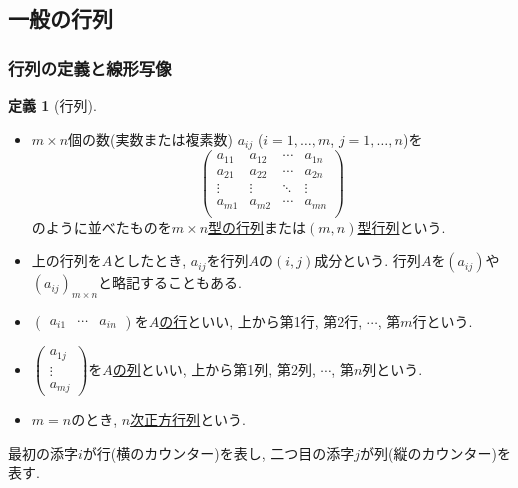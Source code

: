 \documentclass[dvipdfmx,a4paper,11pt]{article}
\theoremstyle{definition}
\newtheorem{dfn}[thm]{定義}
\begin{document}
\subsection{一般の行列 \cite[2.2節]{M}}
\label{subsec-2.2}
\subsubsection{行列の定義と線形写像}
\begin{tcolorbox}[
    colback = white,
    colframe = green!35!black,
    fonttitle = \bfseries,
    breakable = true]
    \begin{dfn}[行列]
    
\begin{itemize}
	\setlength{\parskip}{0cm}
  	\setlength{\itemsep}{0pt} 
\item $m \times n$個の数(実数または複素数) $a_{ij}$ ($i = 1, \ldots, m$, $j = 1, \ldots, n$)を
$$
\begin{pmatrix}
a_{11}& a_{12} & \cdots &a_{1n} \\
a_{21}& a_{22} & \cdots &a_{2n} \\
\vdots& \vdots	&	\ddots   &	\vdots \\
a_{m1}& a_{m2} & \cdots &a_{mn} \\
\end{pmatrix}
$$
のように並べたものを\underline{$m \times n$型の行列}または\underline{$(m,n)$型行列}という. 
\item 上の行列を$A$としたとき, $a_{ij}$を行列$A$の$(i,j)$成分という. 行列$A$を\underline{$(a_{ij})$}や\underline{$(a_{ij})_{m \times n}$}と略記することもある.
\item $\begin{pmatrix} a_{i1} & \cdots & a_{in}\end{pmatrix}$を\underline{$A$の行}といい, 上から第1行, 第2行, $\cdots$, 第$m$行という.
\item $\begin{pmatrix}a_{1j} \\ \vdots  \\ a_{mj}\end{pmatrix}$を\underline{$A$の列}といい, 上から第1列, 第2列, $\cdots$, 第$n$列という.
\item $m=n$のとき, \underline{$n$次正方行列}という.
\end{itemize}
    \end{dfn}
 \end{tcolorbox}
 最初の添字$i$が行(横のカウンター)を表し, 二つ目の添字$j$が列(縦のカウンター)を表す. 
 
\end{document}
